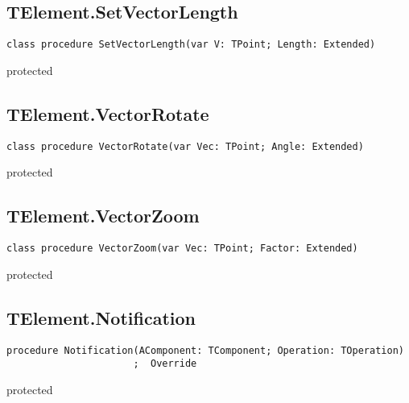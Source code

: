 \subsection{TElement.SetVectorLength}
\label{hmi:drawncontrol:telement:setvectorlength}
\begin{FPCList}
\Declaration 

\begin{verbatim}
class procedure SetVectorLength(var V: TPoint; Length: Extended)
\end{verbatim}
\Visibility
protected
\end{FPCList}
\subsection{TElement.VectorRotate}
\label{hmi:drawncontrol:telement:vectorrotate}
\begin{FPCList}
\Declaration 

\begin{verbatim}
class procedure VectorRotate(var Vec: TPoint; Angle: Extended)
\end{verbatim}
\Visibility
protected
\end{FPCList}
\subsection{TElement.VectorZoom}
\label{hmi:drawncontrol:telement:vectorzoom}
\begin{FPCList}
\Declaration 

\begin{verbatim}
class procedure VectorZoom(var Vec: TPoint; Factor: Extended)
\end{verbatim}
\Visibility
protected
\end{FPCList}
\subsection{TElement.Notification}
\label{hmi:drawncontrol:telement:notification}
\begin{FPCList}
\Declaration 

\begin{verbatim}
procedure Notification(AComponent: TComponent; Operation: TOperation)
                      ;  Override
\end{verbatim}
\Visibility
protected
\end{FPCList}
